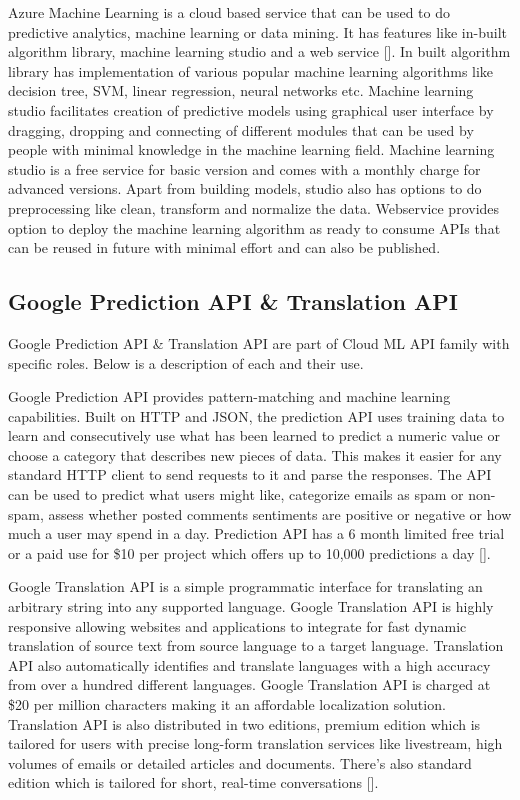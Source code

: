 Azure Machine Learning is a cloud based service that can be used to do
predictive analytics, machine learning or data mining. It has features
like in-built algorithm library, machine learning studio and a web
service [\cite{www-azureMLSite}]. In built algorithm library has
implementation of various popular machine learning algorithms like
decision tree, SVM, linear regression, neural networks etc. Machine
learning studio facilitates creation of predictive models using
graphical user interface by dragging, dropping and connecting of
different modules that can be used by people with minimal knowledge in
the machine learning field. Machine learning studio is a free service
for basic version and comes with a monthly charge for advanced
versions. Apart from building models, studio also has options to do
preprocessing like clean, transform and normalize the data. Webservice
provides option to deploy the machine learning algorithm as ready to
consume APIs that can be reused in future with minimal effort and can
also be published.
    
\subsection{Google Prediction API \& Translation API}

Google Prediction API \& Translation API are part of Cloud ML API
family with specific roles. Below is a description of each and their
use.

Google Prediction API provides pattern-matching and machine learning
capabilities. Built on HTTP and JSON, the prediction API uses training
data to learn and consecutively use what has been learned to predict a
numeric value or choose a category that describes new pieces of
data. This makes it easier for any standard HTTP client to send
requests to it and parse the responses. The API can be used to predict
what users might like, categorize emails as spam or non-spam, assess
whether posted comments sentiments are positive or negative or how
much a user may spend in a day. Prediction API has a 6 month limited
free trial or a paid use for \$10 per project which offers up to
10,000 predictions a day [\cite{www-prediction}].

Google Translation API is a simple programmatic interface for
translating an arbitrary string into any supported language. Google
Translation API is highly responsive allowing websites and
applications to integrate for fast dynamic translation of source text
from source language to a target language. Translation API also
automatically identifies and translate languages with a high accuracy
from over a hundred different languages.  Google Translation API is
charged at \$20 per million characters making it an affordable
localization solution. Translation API is also distributed in two
editions, premium edition which is tailored for users with precise
long-form translation services like livestream, high volumes of emails
or detailed articles and documents. There's also standard edition
which is tailored for short, real-time conversations
[\cite{www-translation}].


